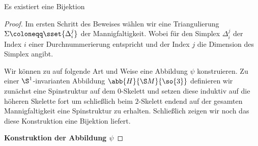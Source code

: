 


\begin{Satz}
	Es existiert eine Bijektion
	\begin{center}
	\end{center}
\begin{proof}
	Im ersten Schritt des Beweises wählen wir eine Triangulierung $\Sigma \coloneqq \sset{ \Delta_i^j}$ der Mannigfaltigkeit. Wobei für den Simplex $\Delta_i^j$ der Index $i$  
	einer Durchnummerierung entspricht und der Index $j$ die Dimension des Simplex angibt.
	
	Wir können zu auf folgende Art und Weise eine Abbildung $\psi$ konstruieren.
	Zu einer $\S^1$-invarianten Abbildung $\abb{H}{\S M}{\so{3}}$ definieren wir
	zunächst eine Spinstruktur auf dem $0$-Skelett und setzen diese induktiv
	auf die höheren Skelette fort um schließlich beim $2$-Skelett endend auf
	der gesamten Mannigfaltigkeit eine Spinstruktur zu erhalten. Schließlich
	zeigen wir noch das diese Konstruktion eine Bijektion liefert.
	
	\textbf{Konstruktion der Abbildung $\psi$}
	

\end{proof}
\end{Satz}
